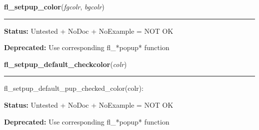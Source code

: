     \label{xformslib:library:fl_setpup_default_color}

    \vspace{0.5ex}

\hspace{.8\funcindent}\begin{boxedminipage}{\funcwidth}

    \raggedright \textbf{fl\_setpup\_color}(\textit{fgcolr}, \textit{bgcolr})

    \vspace{-1.5ex}

    \rule{\textwidth}{0.5\fboxrule}
\setlength{\parskip}{2ex}
\setlength{\parskip}{1ex}
\textbf{Status:} Untested + NoDoc + NoExample = NOT OK



\textbf{Deprecated:} Use corresponding fl\_*popup* function



    \end{boxedminipage}

    \label{xformslib:library:fl_setpup_default_pup_checked_color}

    \vspace{0.5ex}

\hspace{.8\funcindent}\begin{boxedminipage}{\funcwidth}

    \raggedright \textbf{fl\_setpup\_default\_checkcolor}(\textit{colr})

    \vspace{-1.5ex}

    \rule{\textwidth}{0.5\fboxrule}
\setlength{\parskip}{2ex}
    fl\_setpup\_default\_pup\_checked\_color(colr):

\setlength{\parskip}{1ex}
\textbf{Status:} Untested + NoDoc + NoExample = NOT OK



\textbf{Deprecated:} Use corresponding fl\_*popup* function



    \end{boxedminipage}

    \label{xformslib:library:fl_setpup_default_pup_checked_color}

